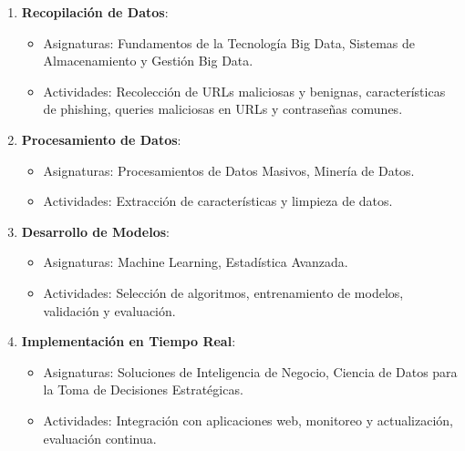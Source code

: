 \begin{enumerate}
    \item \textbf{Recopilación de Datos}: 
    \begin{itemize}
        \item Asignaturas: Fundamentos de la Tecnología Big Data, Sistemas de Almacenamiento y Gestión Big Data.
        \item Actividades: Recolección de URLs maliciosas y benignas, características de phishing, queries maliciosas en URLs y contraseñas comunes.
    \end{itemize}

    \item \textbf{Procesamiento de Datos}:
    \begin{itemize}
        \item Asignaturas: Procesamientos de Datos Masivos, Minería de Datos.
        \item Actividades: Extracción de características y limpieza de datos.
    \end{itemize}

    \item \textbf{Desarrollo de Modelos}:
    \begin{itemize}
        \item Asignaturas: Machine Learning, Estadística Avanzada.
        \item Actividades: Selección de algoritmos, entrenamiento de modelos, validación y evaluación.
    \end{itemize}

    \item \textbf{Implementación en Tiempo Real}:
    \begin{itemize}
        \item Asignaturas: Soluciones de Inteligencia de Negocio, Ciencia de Datos para la Toma de Decisiones Estratégicas.
        \item Actividades: Integración con aplicaciones web, monitoreo y actualización, evaluación continua.
    \end{itemize}
\end{enumerate}

